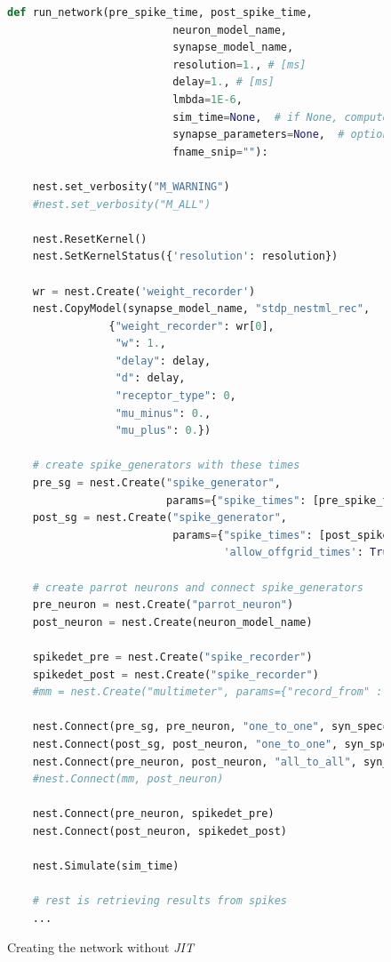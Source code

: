 \begin{figure}[ht!]
\centering
\caption{Creating the network without \emph{JIT}}
\begin{lstlisting}[language=Python, label=lst:build_network_without_jit]
def run_network(pre_spike_time, post_spike_time,
                          neuron_model_name,
                          synapse_model_name,
                          resolution=1., # [ms]
                          delay=1., # [ms]
                          lmbda=1E-6,
                          sim_time=None,  # if None, computed from pre and post spike times
                          synapse_parameters=None,  # optional dictionary passed to the synapse
                          fname_snip=""):

    nest.set_verbosity("M_WARNING")
    #nest.set_verbosity("M_ALL")

    nest.ResetKernel()
    nest.SetKernelStatus({'resolution': resolution})

    wr = nest.Create('weight_recorder')
    nest.CopyModel(synapse_model_name, "stdp_nestml_rec",
                {"weight_recorder": wr[0],
                 "w": 1.,
                 "delay": delay,
                 "d": delay,
                 "receptor_type": 0,
                 "mu_minus": 0.,
                 "mu_plus": 0.})

    # create spike_generators with these times
    pre_sg = nest.Create("spike_generator",
                         params={"spike_times": [pre_spike_time, sim_time - 10.]})
    post_sg = nest.Create("spike_generator",
                          params={"spike_times": [post_spike_time],
                                  'allow_offgrid_times': True})

    # create parrot neurons and connect spike_generators
    pre_neuron = nest.Create("parrot_neuron")
    post_neuron = nest.Create(neuron_model_name)

    spikedet_pre = nest.Create("spike_recorder")
    spikedet_post = nest.Create("spike_recorder")
    #mm = nest.Create("multimeter", params={"record_from" : ["V_m"]})

    nest.Connect(pre_sg, pre_neuron, "one_to_one", syn_spec={"delay": 1.})
    nest.Connect(post_sg, post_neuron, "one_to_one", syn_spec={"delay": 1., "weight": 9999.})
    nest.Connect(pre_neuron, post_neuron, "all_to_all", syn_spec={'synapse_model': 'stdp_nestml_rec'})
    #nest.Connect(mm, post_neuron)

    nest.Connect(pre_neuron, spikedet_pre)
    nest.Connect(post_neuron, spikedet_post)
    
    nest.Simulate(sim_time)
    
    # rest is retrieving results from spikes
    ...

\end{lstlisting}
\end{figure}

